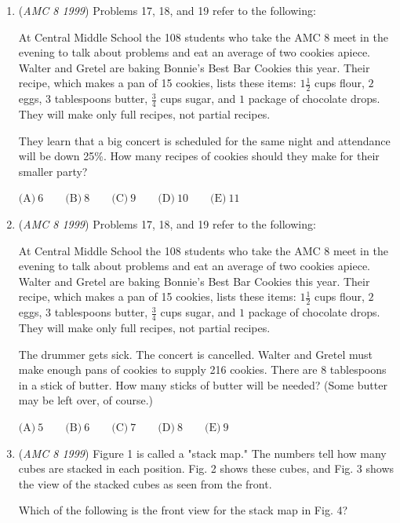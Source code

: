 \begin{enumerate}
 $\text{(A)}\ 1 \qquad \text{(B)}\ 2 \qquad \text{(C)}\ 5 \qquad \text{(D)}\ 7 \qquad \text{(E)}\ 15$


	\item (\textit{AMC 8 1999}) Problems 17, 18, and 19 refer to the following:


 At Central Middle School the 108 students who take the AMC 8 meet in the evening to talk about problems and eat an average of two cookies apiece. Walter and Gretel are baking Bonnie's Best Bar Cookies this year. Their recipe, which makes a pan of 15 cookies, lists these items: $1\frac{1}{2}$ cups flour, $2$ eggs, $3$ tablespoons butter, $\frac{3}{4}$ cups sugar, and $1$ package of chocolate drops. They will make only full recipes, not partial recipes.


 They learn that a big concert is scheduled for the same night and attendance will be down 25\%. How many recipes of cookies should they make for their smaller party?


 $\text{(A)}\ 6 \qquad \text{(B)}\ 8 \qquad \text{(C)}\ 9 \qquad \text{(D)}\ 10 \qquad \text{(E)}\ 11$


	\item (\textit{AMC 8 1999}) Problems 17, 18, and 19 refer to the following:


 At Central Middle School the 108 students who take the AMC 8 meet in the evening to talk about problems and eat an average of two cookies apiece. Walter and Gretel are baking Bonnie's Best Bar Cookies this year. Their recipe, which makes a pan of 15 cookies, lists these items: $1\frac{1}{2}$ cups flour, $2$ eggs, $3$ tablespoons butter, $\frac{3}{4}$ cups sugar, and $1$ package of chocolate drops. They will make only full recipes, not partial recipes.


 The drummer gets sick. The concert is cancelled. Walter and Gretel must make enough pans of cookies to supply 216 cookies. There are 8 tablespoons in a stick of butter. How many sticks of butter will be needed? (Some butter may be left over, of course.)


 $\text{(A)}\ 5 \qquad \text{(B)}\ 6 \qquad \text{(C)}\ 7 \qquad \text{(D)}\ 8 \qquad \text{(E)}\ 9$


	\item (\textit{AMC 8 1999}) Figure 1 is called a "stack map." The numbers tell how many cubes are stacked in each position. Fig. 2 shows these cubes, and Fig. 3 shows the view of the stacked cubes as seen from the front.


 Which of the following is the front view for the stack map in Fig. 4?



\end{enumerate}

